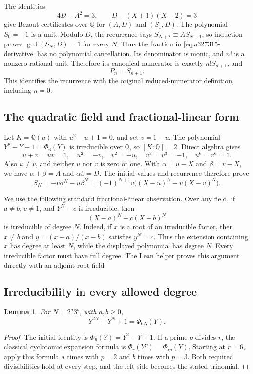 \documentclass[11pt]{article}
\newtheorem{lemma}[theorem]{Lemma}
\begin{document}
The identities
\[
 4D-A^2=3,\qquad D-(X+1)(X-2)=3
\]
give Bezout certificates over $\mathbb Q$ for $(A,D)$ and $(S_1,D)$.
The polynomial $S_0=-1$ is a unit.  Modulo $D$, the recurrence says
$S_{N+2}\equiv A S_{N+1}$, so induction proves
$\gcd(S_N,D)=1$ for every $N$.  Thus the fraction in
\eqref{eq:a327315-derivative} has no polynomial cancellation.  Its
denominator is monic, and $n!$ is a nonzero rational unit.  Therefore its
canonical numerator is exactly $n!S_{n+1}$, and
\begin{equation}
\label{eq:a327315-source}
 P_n=S_{n+1}.
\end{equation}
This identifies the recurrence with the original reduced-numerator
definition, including $n=0$.

\subsection{The quadratic field and fractional-linear form}

Let $K=\mathbb Q(u)$ with $u^2-u+1=0$, and set $v=1-u$.
The polynomial $Y^2-Y+1=\Phi_6(Y)$ is irreducible over $\mathbb Q$, so
$[K:\mathbb Q]=2$.  Direct algebra gives
\[
 u+v=uv=1,\quad u^2=-v,\quad v^2=-u,\quad
 u^3=v^3=-1,\quad u^6=v^6=1.
\]
Also $u\ne v$, and neither $u$ nor $v$ is zero or one.
With $\alpha=u-X$ and $\beta=v-X$, we have
$\alpha+\beta=A$ and $\alpha\beta=D$.  The initial values and
recurrence therefore prove
\begin{equation}
\label{eq:a327315-closed}
 S_N=-v\alpha^N-u\beta^N
 =(-1)^{N+1}v\big((X-u)^N-v(X-v)^N\big).
\end{equation}

We use the following standard fractional-linear observation.  Over any
field, if $a\ne b$, $c\ne1$, and $Y^N-c$ is irreducible, then
\[
 (X-a)^N-c(X-b)^N
\]
is irreducible of degree $N$.  Indeed, if $x$ is a root of an irreducible
factor, then $x\ne b$ and
$y=(x-a)/(x-b)$ satisfies $y^N=c$.  Thus the extension containing $x$
has degree at least $N$, while the displayed polynomial has degree $N$.
Every irreducible factor must have full degree.  The Lean helper proves
this argument directly with an adjoint-root field.

\subsection{Irreducibility in every allowed degree}

\begin{lemma}
\label{lem:a327315-cyclotomic}
For $N=2^a3^b$, with $a,b\ge0$,
\[
 Y^{2N}-Y^N+1=\Phi_{6N}(Y).
\]
\end{lemma}
\begin{proof}
The initial identity is $\Phi_6(Y)=Y^2-Y+1$.  If a prime $p$ divides
$r$, the classical cyclotomic expansion formula is
$\Phi_r(Y^p)=\Phi_{rp}(Y)$.  Starting at $r=6$, apply this formula
$a$ times with $p=2$ and $b$ times with $p=3$.  Both required divisibilities
hold at every step, and the left side becomes the stated trinomial.
\end{proof}
\end{document}
